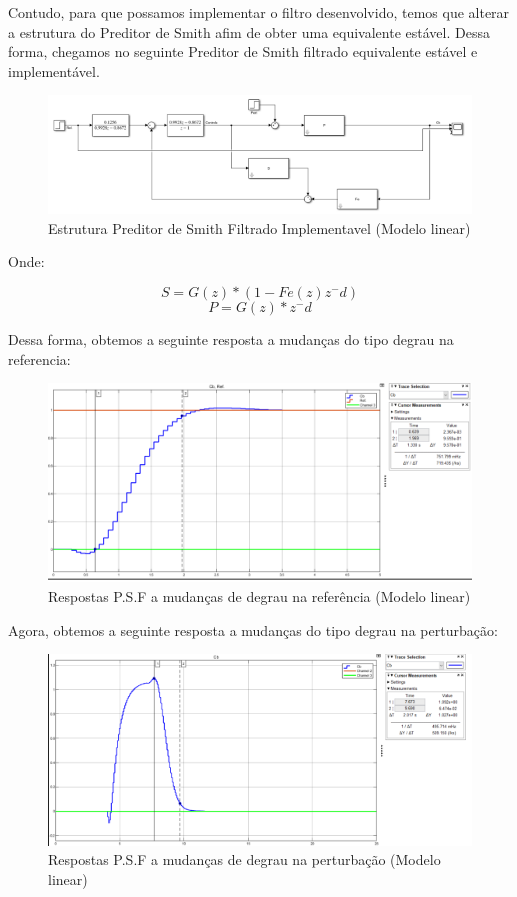 \documentclass[a4paper,12pt]{article}
\begin{document}
Contudo, para que possamos implementar o filtro desenvolvido, temos que alterar a estrutura do Preditor de Smith afim de obter uma equivalente estável. Dessa forma, chegamos no seguinte Preditor de Smith filtrado equivalente estável e implementável.

\begin{figure}[H]
    \centering
    \includegraphics[width=0.9\linewidth]{image3.png}
    \caption{Estrutura Preditor de Smith Filtrado Implementavel (Modelo linear)}
    \label{fig:enter-label}
\end{figure}

Onde:

\begin{equation}
S = G(z)*(1-Fe(z)z^-d)
\end{equation}
\begin{equation}
P = G(z)*z^-d
\end{equation}

Dessa forma, obtemos a seguinte resposta a mudanças do tipo degrau na referencia:

\begin{figure}[H]
    \centering
    \includegraphics[width=0.9\linewidth]{image4.png}
    \caption{Respostas P.S.F a mudanças de degrau na referência (Modelo linear)}
    \label{fig:enter-label}
\end{figure}

Agora, obtemos a seguinte resposta a mudanças do tipo degrau na perturbação:

\begin{figure}[H]
    \centering
    \includegraphics[width=0.9\linewidth]{image5.png}
    \caption{Respostas P.S.F a mudanças de degrau na perturbação (Modelo linear)}
    \label{fig:enter-label}
\end{figure}
\end{document}
